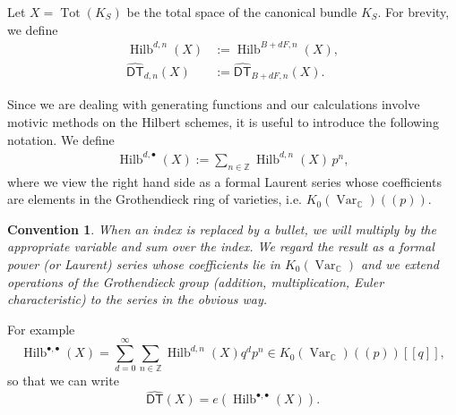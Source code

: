 \documentclass[12pt]{amsart}
\newtheorem{convention}{Convention}[theorem]
\theoremstyle{definition}
\newcommand{\CC} {\mathbb{C}}          %
\newcommand{\ZZ} {\mathbb{Z}}		%
\newcommand{\Hilb}{\operatorname{Hilb}}
\newcommand{\Tot}{\operatorname{Tot}}
\newcommand{\DT}{\mathsf{DT}}
\newcommand{\Var}{\operatorname{Var}}
\newcommand{\conn}{\operatorname{conn}}
\newcommand{\DThat}{\widehat{\DT}}
\begin{document}
Let $X = \Tot(K_S)$ be the total space of the canonical bundle $K_S$. 
For brevity, we define
\begin{align*}
\Hilb^{d,n}(X) &:=\Hilb^{B+dF,n}(X), \\
\DThat _{d,n}(X) &:= \DThat_{B+dF,n}(X).
\end{align*}


\begin{comment}
The generating functions of interest are
\begin{align*}
\DT(X) &:= \sum_{d \geq 0} \DT_d(X) \, q^d := \sum_{d \geq 0} \sum_{n \in \ZZ} \DT_{d,n}(X) \, (-p)^n q^d, \\
\DThat (X) &:= \sum_{d \geq 0} \DThat _d(X) \, q^d := \sum_{d \geq 0} \sum_{n \in \ZZ} \DThat _{d,n}(X) \, p^n q^d.
\end{align*}
The corresponding connected series $\DT^{\conn}(X)$ and $\DThat ^{\conn}(X)$ are obtained after dividing by
\begin{align*}
&\sum_{d \geq 0} \sum_{n \in \ZZ} e(\Hilb^{dF,n}(X),\nu) \, (-p)^n q^d, \\
&\sum_{d \geq 0} \sum_{n \in \ZZ} e(\Hilb^{dF,n}(X)) \, p^n q^d,
\end{align*}
respectively.
\end{comment}

Since we are dealing with generating functions and our calculations
involve motivic methods on the Hilbert schemes, it is useful to
introduce the following notation. We define
\begin{align*}
\Hilb^{d,\bullet}(X) := \sum_{n \in \ZZ} \Hilb^{d,n}(X) \, p^n,
\end{align*}
where we view the right hand side as a formal Laurent series whose
coefficients are elements in the Grothendieck ring of varieties,
i.e. $K_0(\Var_{\CC})(\!(p)\!)$.



\begin{convention}\label{conv: bullet convention}
When an index is replaced by a bullet, we will multiply by the
appropriate variable and sum over the index. We regard the result as a
formal power (or Laurent) series whose coefficients lie in
$K_{0}(\Var_{\CC})$ and we extend operations of the Grothendieck group
(addition, multiplication, Euler characteristic) to the series in the
obvious way.
\end{convention}

For example
\[
\Hilb^{\bullet ,\bullet}(X) = \sum_{d=0}^{\infty}\sum_{n\in \ZZ}
\Hilb^{d,n}(X) q^{d}p^{n}\in K_{0}(\Var_{\CC})(\!(p)\!)[[q]],
\]
so that we can write
\[
\DThat (X) = e(\Hilb^{\bullet ,\bullet}(X)).
\]
\end{document}
